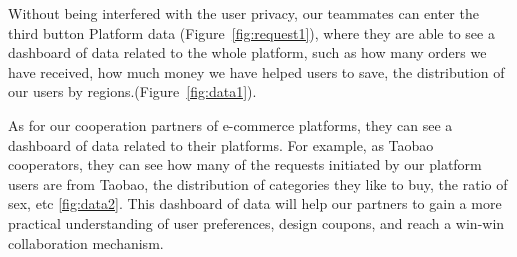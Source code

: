 Without being interfered with the user privacy, our teammates can enter the third button Platform data (Figure~\ref{fig:request1}), where they are able to see a dashboard of data related to the whole platform, such as how many orders we have received, how much money we have helped users to save, the distribution of our users by regions.(Figure~\ref{fig:data1}).

As for our cooperation partners of e-commerce platforms, they can see a dashboard of data related to their platforms. For example, as Taobao cooperators, they can see how many of the requests initiated by our platform users are from Taobao, the distribution of categories they like to buy, the ratio of sex, etc \ref{fig:data2}. This dashboard of data will help our partners to gain a more practical understanding of user preferences, design coupons, and reach a win-win collaboration mechanism.
